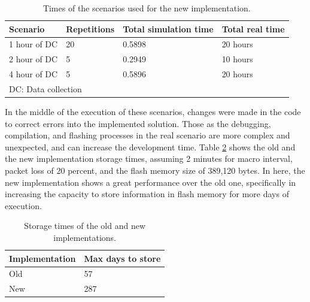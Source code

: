 \documentclass[journal]{IEEEtran}	%
\begin{document}
\begin{table}[h!]
    \renewcommand{\arraystretch}{1.25}		%
    \centering
    \caption{Times of the scenarios used for the new implementation.}	%
    \label{tab:scenariosNewImpl}
    \begin{tabular}{l|l|l|l}					%
    \hline \hline
    \textbf{Scenario}        &    \textbf{Repetitions} &    \textbf{Total simulation time} &    \textbf{Total real time}\\
    \hline
    1 hour of DC      &   20   &   0.5898 &   20 hours\\
    2 hour of DC      &    5   &   0.2949 &   10 hours\\
    4 hour of DC      &    5   &   0.5896 &   20 hours\\
    \hline
    \multicolumn{4}{l}{DC: Data collection}	\\
    \hline \hline
    \end{tabular}
\end{table}

In the middle of the execution of these scenarios, changes were made in the code to correct errors into the implemented solution. Those as the debugging, compilation, and flashing processes in the real scenario are more complex and unexpected, and can increase the development time. Table \ref{tab:advantageNewImpl} shows the old and the new implementation storage times,  assuming 2 minutes for macro interval, packet loss of 20 percent, and the flash memory size of 389,120 bytes. In here, the new implementation shows a great performance over the old one, specifically in increasing the capacity to store information in flash memory for more days of execution.

\begin{table}[h!]
    \renewcommand{\arraystretch}{1.25}		%
    \centering
    \caption{Storage times of the old and new implementations.}	%
    \label{tab:advantageNewImpl}
    \begin{tabular}{l|l}					%
    \hline \hline
    \textbf{Implementation}        &    \textbf{Max days to store}\\
    \hline
    Old      &   57  \\
    New      &   287  \\
    \hline \hline
    \end{tabular}
\end{table}
\end{document}
